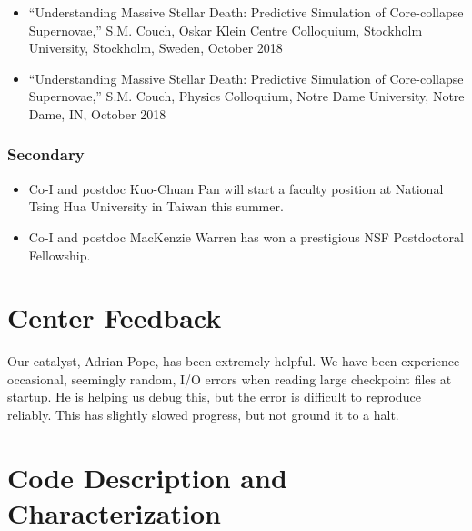 \documentclass[12pt,titlepage]{article}
\begin{document}
\begin{itemize}
  \item ``Understanding Massive Stellar Death: Predictive Simulation of Core-collapse Supernovae,'' S.M. Couch, Oskar Klein Centre Colloquium, Stockholm University, Stockholm, Sweden, October 2018
  \item ``Understanding Massive Stellar Death: Predictive Simulation of Core-collapse Supernovae,'' S.M. Couch, Physics Colloquium, Notre Dame University, Notre Dame, IN, October 2018
\end{itemize}

\subsubsection{Secondary}

\begin{itemize}
  \item Co-I and postdoc Kuo-Chuan Pan will start a faculty position at National Tsing Hua University in Taiwan this summer.
  \item Co-I and postdoc MacKenzie Warren has won a prestigious NSF Postdoctoral Fellowship.
\end{itemize}

\section{Center Feedback}

Our catalyst, Adrian Pope, has been extremely helpful.
We have been experience occasional, seemingly random, I/O errors when reading large checkpoint files at startup.
He is helping us debug this, but the error is difficult to reproduce reliably.
This has slightly slowed progress, but not ground it to a halt.


\section{Code Description and Characterization}
\end{document}
